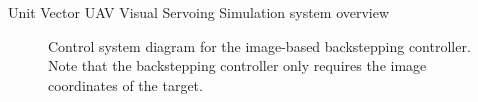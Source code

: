 \documentclass[9pt]{beamer}
\begin{document}
\begin{frame}{Unit Vector UAV Visual Servoing}
Simulation system overview
\begin{figure}[htbp]
	\centering
	\caption{Control system diagram for the image-based backstepping controller. Note that the backstepping controller only requires the image coordinates of the target.}
	\label{system_image}
\end{figure}
\end{frame}
\end{document}
